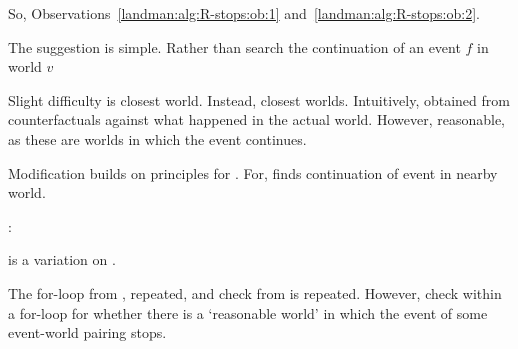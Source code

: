 \begin{note}
  So, Observations~\ref{landman:alg:R-stops:ob:1} and~\ref{landman:alg:R-stops:ob:2}.

  The suggestion is simple.
  Rather than search the continuation of an event \(f\) in world \(v\) 

  Slight difficulty is closest world.
  Instead, closest worlds.
  Intuitively, obtained from counterfactuals against what happened in the actual world.
  However, reasonable, as these are worlds in which the event continues.
\end{note}

\begin{note}
  Modification builds on principles for \AlgFindBranches{}.
  For, \AlgFindBranches{} finds continuation of event in nearby world.


  \AlgGetPStops{}:

  \begin{algorithm}[H]
    \label{PrAl:g-s:poss}
    \caption{\AlgGetPStops{}}
    \SetAlgoLined
    \DontPrintSemicolon
  \end{algorithm}

  \AlgGetPStops{} is a variation on \AlgGetStops{}.

  The for-loop from \AlgGetStops{}, repeated, and check from \AlgGetStops{} is repeated.
  However, check within a for-loop for whether there is a `reasonable world' in which the event of some event-world pairing stops.
\end{note}

